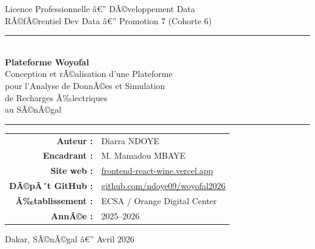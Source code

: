 \documentclass[12pt,a4paper]{report}
\begin{document}
\begin{titlepage}
  \centering
  \vspace*{1.5cm}


  \vspace{1.2cm}
  {\large Licence Professionnelle â€” DÃ©veloppement Data}\\[0.3cm]
  {\small RÃ©fÃ©rentiel Dev Data â€” Promotion 7 (Cohorte 6)}

  \vspace{1.5cm}
  \rule{\textwidth}{0.8pt}\\[0.4cm]
  {\Huge\bfseries\color{marine} Plateforme Woyofal}\\[0.3cm]
  {\Large\color{rouge} Conception et rÃ©alisation d'une Plateforme\\
  pour l'Analyse de DonnÃ©es et Simulation\\de Recharges Ã‰lectriques}\\
  {\large au SÃ©nÃ©gal}\\[0.4cm]
  \rule{\textwidth}{0.8pt}

  \vspace{1.5cm}
  \begin{tabular}{rl}
    \textbf{Auteur :}        & Diarra NDOYE \\[4pt]
    \textbf{Encadrant :}     & M. Mamadou MBAYE \\[4pt]
    \textbf{Site web :}      & \href{https://frontend-react-wine.vercel.app}{frontend-react-wine.vercel.app} \\[4pt]
    \textbf{DÃ©pÃ´t GitHub :}  & \href{https://github.com/ndoye09/woyofal2026}{github.com/ndoye09/woyofal2026} \\[4pt]
    \textbf{Ã‰tablissement :} & ECSA / Orange Digital Center \\[4pt]
    \textbf{AnnÃ©e :}         & 2025--2026 \\
  \end{tabular}

  \vfill
  {\small Dakar, SÃ©nÃ©gal â€” Avril 2026}
\end{titlepage}
\end{document}
